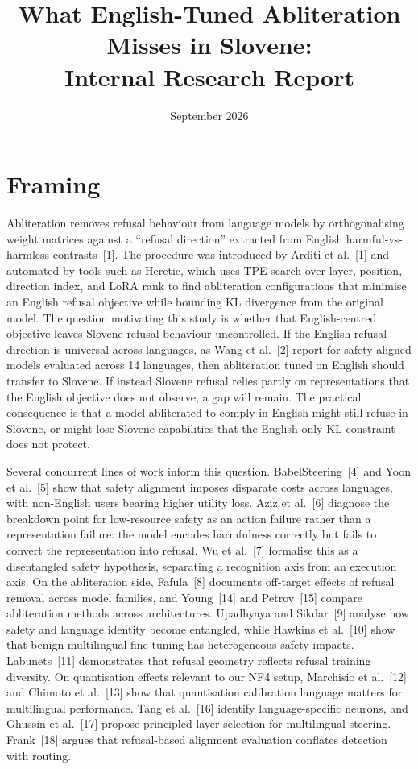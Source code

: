 \documentclass[11pt,letterpaper]{article}
\title{What English-Tuned Abliteration Misses in Slovene:\\
Internal Research Report}
\author{}
\date{September 2026}
\begin{document}
\maketitle
\tableofcontents
\clearpage

\section{Framing}\label{sec:framing}

Abliteration removes refusal behaviour from language models by orthogonalising weight matrices against a ``refusal direction'' extracted from English harmful-vs-harmless contrasts~[1]. The procedure was introduced by Arditi et al.~[1] and automated by tools such as Heretic, which uses TPE search over layer, position, direction index, and LoRA rank to find abliteration configurations that minimise an English refusal objective while bounding KL divergence from the original model. The question motivating this study is whether that English-centred objective leaves Slovene refusal behaviour uncontrolled. If the English refusal direction is universal across languages, as Wang et al.~[2] report for safety-aligned models evaluated across 14 languages, then abliteration tuned on English should transfer to Slovene. If instead Slovene refusal relies partly on representations that the English objective does not observe, a gap will remain. The practical consequence is that a model abliterated to comply in English might still refuse in Slovene, or might lose Slovene capabilities that the English-only KL constraint does not protect.

Several concurrent lines of work inform this question. BabelSteering~[4] and Yoon et al.~[5] show that safety alignment imposes disparate costs across languages, with non-English users bearing higher utility loss. Aziz et al.~[6] diagnose the breakdown point for low-resource safety as an action failure rather than a representation failure: the model encodes harmfulness correctly but fails to convert the representation into refusal. Wu et al.~[7] formalise this as a disentangled safety hypothesis, separating a recognition axis from an execution axis. On the abliteration side, Fafula~[8] documents off-target effects of refusal removal across model families, and Young~[14] and Petrov~[15] compare abliteration methods across architectures. Upadhyaya and Sikdar~[9] analyse how safety and language identity become entangled, while Hawkins et al.~[10] show that benign multilingual fine-tuning has heterogeneous safety impacts. Labunets~[11] demonstrates that refusal geometry reflects refusal training diversity. On quantisation effects relevant to our NF4 setup, Marchisio et al.~[12] and Chimoto et al.~[13] show that quantisation calibration language matters for multilingual performance. Tang et al.~[16] identify language-specific neurons, and Ghussin et al.~[17] propose principled layer selection for multilingual steering. Frank~[18] argues that refusal-based alignment evaluation conflates detection with routing.
\end{document}
